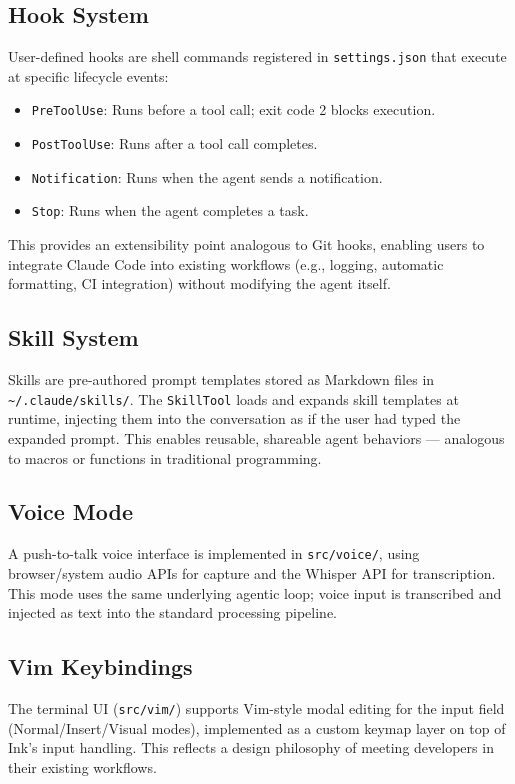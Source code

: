 \documentclass{article}
\begin{document}
\subsection{Hook System}

User-defined hooks are shell commands registered in \texttt{settings.json} that execute at specific lifecycle events:
\begin{itemize}
  \item \texttt{PreToolUse}: Runs before a tool call; exit code 2 blocks execution.
  \item \texttt{PostToolUse}: Runs after a tool call completes.
  \item \texttt{Notification}: Runs when the agent sends a notification.
  \item \texttt{Stop}: Runs when the agent completes a task.
\end{itemize}
This provides an extensibility point analogous to Git hooks, enabling users to integrate Claude Code into existing workflows (e.g., logging, automatic formatting, CI integration) without modifying the agent itself.

\subsection{Skill System}

Skills are pre-authored prompt templates stored as Markdown files in \texttt{\textasciitilde/.claude/skills/}. The \texttt{SkillTool} loads and expands skill templates at runtime, injecting them into the conversation as if the user had typed the expanded prompt. This enables reusable, shareable agent behaviors --- analogous to macros or functions in traditional programming.

\subsection{Voice Mode}

A push-to-talk voice interface is implemented in \texttt{src/voice/}, using browser/system audio APIs for capture and the Whisper API for transcription. This mode uses the same underlying agentic loop; voice input is transcribed and injected as text into the standard processing pipeline.

\subsection{Vim Keybindings}

The terminal UI (\texttt{src/vim/}) supports Vim-style modal editing for the input field (Normal/Insert/Visual modes), implemented as a custom keymap layer on top of Ink's input handling. This reflects a design philosophy of meeting developers in their existing workflows.
\end{document}
